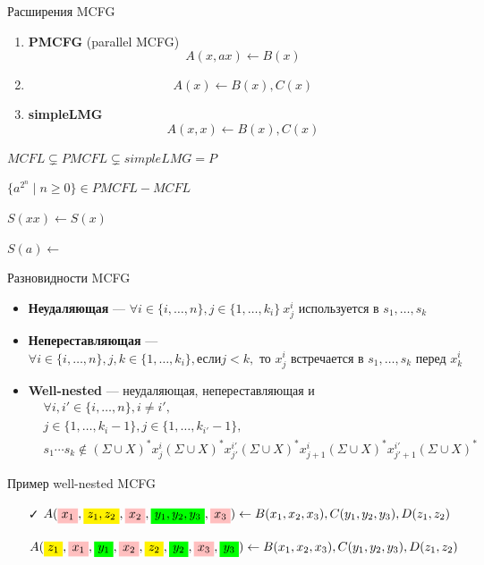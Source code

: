     

    
    Расширения MCFG
    \begin{enumerate}
      \item \textbf{PMCFG} (parallel MCFG)
      $$
      A(x, ax) \leftarrow B(x)
      $$
  
      \item
      $$
      A(x) \leftarrow B(x),C(x)
      $$
      \item \textbf{simpleLMG}
      $$
      A(x, x) \leftarrow B(x),C(x)
      $$
    \end{enumerate}

    $MCFL \varsubsetneq PMCFL \varsubsetneq simpleLMG = P$
  
    $\{a^{2^n} \mid n\geq 0\} \in PMCFL - MCFL $
  
    $S(xx) \leftarrow S(x)$
  
    $S(a) \leftarrow $

    Разновидности MCFG
  \begin{itemize}
    \item \textbf{Неудаляющая} --- $\forall i \in \{i,\ldots,n\}, j\in \{1,\ldots,k_i\} \ x^i_j \text{ используется в } s_1,\ldots,s_k $    
    \item \textbf{Непереставляющая} --- $\forall i \in \{i,\ldots,n\}, j,k\in \{1,\ldots,k_i\}, \text{если} j < k, \text{ то } x^i_j \text{ встречается в } s_1,\ldots,s_k  \text{ перед } x^i_k$
    \item \textbf{Well-nested} --- неудаляющая, непереставляющая и
    \begin{align*}
    &\forall i,i' \in \{i,\ldots,n\}, i\neq i', \\
    &j\in \{1,\ldots,k_i-1\}, j\in \{1,\ldots,k_{i'}-1\},\\
    &s_1\cdots s_k \notin (\Sigma \cup X)^* x^i_j (\Sigma \cup X)^* x^{i'}_{j'} (\Sigma \cup X)^* x^i_{j+1} (\Sigma \cup X)^* x^{i'}_{j'+1}(\Sigma \cup X)^*
    \end{align*}
  \end{itemize}

  Пример well-nested MCFG
  \begin{itemize}    
    \item[\faCheck] $A(\highlight[pink]{x_1},\highlight{z_1,z_2},\highlight[pink]{x_2},\highlight[green]{y_1,y_2,y_3},\highlight[pink]{x_3}) \leftarrow B(x_1,x_2,x_3),C(y_1,y_2,y_3),D(z_1,z_2)$
    \item[\faTimes] $A(\highlight{z_1},\highlight[pink]{x_1},\highlight[green]{y_1},\highlight[pink]{x_2},\highlight{z_2},\highlight[green]{y_2},\highlight[pink]{x_3},\highlight[green]{y_3}) \leftarrow B(x_1,x_2,x_3),C(y_1,y_2,y_3),D(z_1,z_2)$
  \end{itemize}


